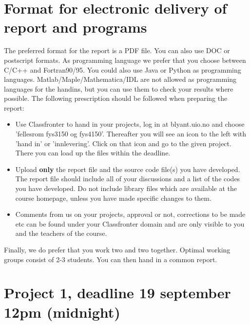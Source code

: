 \section*{Format for electronic delivery of report and programs}
%
The preferred format for the report is a PDF file. You can also
use DOC or postscript formats. 
As programming language we prefer that you choose between C/C++ and Fortran90/95.
You could also use Java or Python as programming languages. 
Matlab/Maple/Mathematica/IDL are not allowed as programming
languages for the handins, but you can use them to check your results where possible.
The following prescription should be followed when preparing the report:
\begin{itemize}
\item Use Classfronter to hand in your projects, log in  at 
blyant.uio.no and choose 'fellesrom fys3150 og fys4150'.
Thereafter you will see an icon to the left with 'hand in' or 'innlevering'.
Click on that icon and go to the given project. 
There you can load up the files within the deadline.
\item Upload {\bf only} the report file and the source code file(s) you have developed.
The report file should include all of your discussions and a list of the codes you have developed. 
Do not include library files which are available at the course homepage, unless you have
made specific changes to them.
\item Comments  from us on your projects, approval or not, corrections to be made 
etc can be found under
your Classfronter domain and are only visible to you and the teachers of the course.
 
\end{itemize}
Finally, 
we do prefer that you work two and two together. Optimal working groups consist of 
2-3 students. You can then hand in a common report. 

\section*{Project 1, deadline 19 september 12pm (midnight)}

